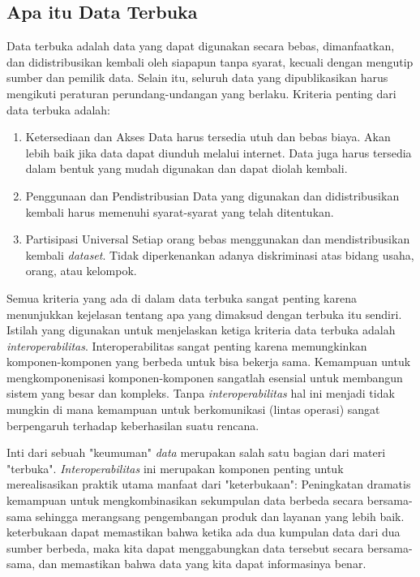 \subsection{Apa itu Data Terbuka}
\label{sec: Apa itu Data Terbuka}
Data terbuka adalah data yang dapat digunakan secara bebas, dimanfaatkan, dan didistribusikan kembali oleh siapapun tanpa syarat, kecuali dengan mengutip sumber dan pemilik data. Selain itu, seluruh data yang dipublikasikan harus mengikuti peraturan perundang-undangan yang berlaku. Kriteria penting dari data terbuka adalah:
\begin{enumerate}
\item Ketersediaan dan Akses
Data harus tersedia utuh dan bebas biaya. Akan lebih baik jika data dapat diunduh melalui internet. Data juga harus tersedia dalam bentuk yang mudah digunakan dan dapat diolah kembali.
\item Penggunaan dan Pendistribusian 
Data yang digunakan dan didistribusikan kembali harus memenuhi syarat-syarat yang telah ditentukan.
\item Partisipasi Universal
Setiap orang bebas menggunakan dan mendistribusikan kembali \textit{dataset}. Tidak diperkenankan adanya diskriminasi atas bidang usaha, orang, atau kelompok.
\end{enumerate}

Semua kriteria yang ada di dalam data terbuka sangat penting karena menunjukkan kejelasan tentang apa yang dimaksud dengan terbuka itu sendiri. Istilah yang digunakan untuk menjelaskan ketiga kriteria data terbuka adalah \textit{interoperabilitas}. Interoperabilitas sangat penting karena memungkinkan komponen-komponen yang berbeda untuk bisa bekerja sama. Kemampuan untuk mengkomponenisasi komponen-komponen sangatlah esensial untuk membangun sistem yang besar dan kompleks. Tanpa \textit{interoperabilitas} hal ini menjadi tidak mungkin di mana kemampuan untuk berkomunikasi (lintas operasi) sangat berpengaruh terhadap keberhasilan suatu rencana.

Inti dari sebuah "keumuman" \textit{data} merupakan salah satu bagian dari materi "terbuka". \textit{Interoperabilitas} ini merupakan komponen penting untuk merealisasikan praktik utama manfaat dari "keterbukaan": Peningkatan dramatis kemampuan untuk mengkombinasikan sekumpulan data berbeda secara bersama-sama sehingga merangsang pengembangan produk dan layanan yang lebih baik. keterbukaan dapat memastikan bahwa ketika ada dua kumpulan data dari dua sumber berbeda, maka kita dapat menggabungkan data tersebut secara bersama-sama, dan memastikan bahwa data yang kita dapat informasinya benar.

